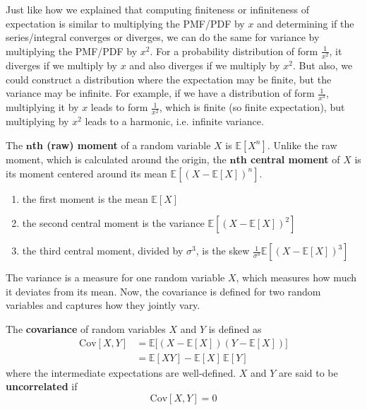   Just like how we explained that computing finiteness or infiniteness of expectation is similar to multiplying the PMF/PDF by $x$ and determining if the series/integral converges or diverges, we can do the same for variance by multiplying the PMF/PDF by $x^2$. For a probability distribution of form $\frac{1}{x^2}$, it diverges if we multiply by $x$ and also diverges if we multiply by $x^2$. But also, we could construct a distribution where the expectation may be finite, but the variance may be infinite. For example, if we have a distribution of form $\frac{1}{x^3}$, multiplying it by $x$ leads to form $\frac{1}{x^2}$, which is finite (so finite expectation), but multiplying by $x^2$ leads to a harmonic, i.e. infinite variance. 

  \begin{definition}[Moment]
    The \textbf{$\mathbf{n}$th (raw) moment} of a random variable $X$ is $\mathbb{E}[X^n]$. Unlike the raw moment, which is calculated around the origin, the \textbf{$\mathbf{n}$th central moment} of $X$ is its moment centered around its mean $\mathbb{E}[(X - \mathbb{E}[X])^n]$. 
    \begin{enumerate}
      \item the first moment is the mean $\mathbb{E}[X]$
      \item the second central moment is the variance $\mathbb{E}[(X - \mathbb{E}[X])^2]$ 
      \item the third central moment, divided by $\sigma^3$, is the skew $\frac{1}{\sigma^3} \mathbb{E}[(X - \mathbb{E}[X])^3]$ 
    \end{enumerate}
  \end{definition}

  The variance is a measure for one random variable $X$, which measures how much it deviates from its mean. Now, the covariance is defined for two random variables and captures how they jointly vary. 

  \begin{definition}[Covariance]
    The \textbf{covariance} of random variables $X$ and $Y$ is defined as 
    \begin{align*}
      \mathrm{Cov}[X, Y] & = \mathbb{E} \big[ (X - \mathbb{E}[X]) (Y - \mathbb{E}[X]) \big] \\
      & = \mathbb{E}[X Y] - \mathbb{E}[X] \, \mathbb{E}[Y]
    \end{align*}
    where the intermediate expectations are well-defined. $X$ and $Y$ are said to be \textbf{uncorrelated} if 
    \begin{equation}
      \mathrm{Cov}[X, Y] = 0
    \end{equation}
  \end{definition}

